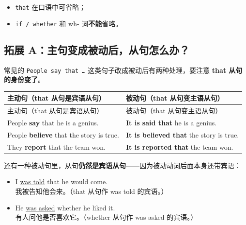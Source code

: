 \documentclass[11pt,a4paper]{ctexart}
\begin{document}
\begin{itemize}[leftmargin=1.4em]
\item \texttt{that} 在口语中可省略；
\item \texttt{if / whether} 和 wh- 词\textbf{不能}省略。
\end{itemize}

\subsection*{拓展 A：主句变成被动后，从句怎么办？}

常见的 \texttt{People say that …} 这类句子改成被动后有两种处理，要注意 \textbf{that 从句的身份变了}。

{\footnotesize
\begin{longtable}{p{6.70cm}p{6.70cm}}
\hline
主动句（that 从句是宾语从句） & 被动句（that 从句变主语从句） \\
\hline
\endfirsthead
\hline
主动句（that 从句是宾语从句） & 被动句（that 从句变主语从句） \\
\hline
\endhead
\hline
\endfoot
People \textbf{say} that he is a genius. & \textbf{It is said that} he is a genius. \\
People \textbf{believe} that the story is true. & \textbf{It is believed that} the story is true. \\
They \textbf{report} that the team won. & \textbf{It is reported that} the team won. \\
\end{longtable}
}

\begin{center}\end{center}

还有一种被动句里，从句\textbf{仍然是宾语从句}——因为被动动词后面本身还带宾语：

\begin{itemize}[leftmargin=1.4em]
\item I \underline{was told} that he would come.\\ 我被告知他会来。（that 从句作 was told 的宾语。）
\item He \underline{was asked} whether he liked it.\\ 有人问他是否喜欢它。（whether 从句作 was asked 的宾语。）
\end{itemize}
\end{document}
